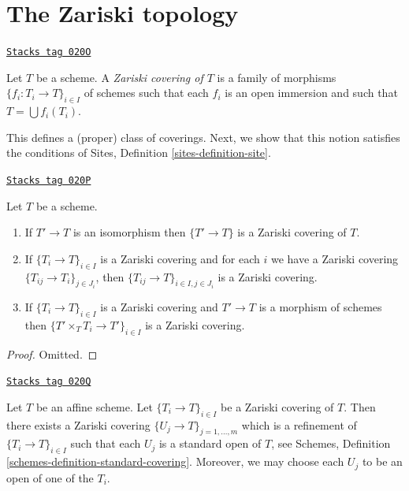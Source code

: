 \section{The Zariski topology}
\label{topologies-section-zariski}
\begin{definition}
\label{topologies-definition-zariski-covering}
\href{https://stacks.math.columbia.edu/tag/020O}{\texttt{Stacks tag 020O}}

Let $T$ be a scheme. A {\it Zariski covering of $T$} is a family
of morphisms $\{f_i : T_i \to T\}_{i \in I}$ of schemes
such that each $f_i$ is an open immersion and such
that $T = \bigcup f_i(T_i)$.
\end{definition}

This defines a (proper) class of coverings.
Next, we show that this notion satisfies the conditions of
Sites, Definition \ref{sites-definition-site}.

\begin{lemma}[Zariski]
\label{topologies-lemma-zariski}
\href{https://stacks.math.columbia.edu/tag/020P}{\texttt{Stacks tag 020P}}

Let $T$ be a scheme.
\begin{enumerate}
\item If $T' \to T$ is an isomorphism then $\{T' \to T\}$
is a Zariski covering of $T$.
\item If $\{T_i \to T\}_{i\in I}$ is a Zariski covering and for each
$i$ we have a Zariski covering $\{T_{ij} \to T_i\}_{j\in J_i}$, then
$\{T_{ij} \to T\}_{i \in I, j\in J_i}$ is a Zariski covering.
\item If $\{T_i \to T\}_{i\in I}$ is a Zariski covering
and $T' \to T$ is a morphism of schemes then
$\{T' \times_T T_i \to T'\}_{i\in I}$ is a Zariski covering.
\end{enumerate}
\end{lemma}

\begin{proof}
Omitted.
\end{proof}

\begin{lemma}
\label{topologies-lemma-zariski-affine}
\href{https://stacks.math.columbia.edu/tag/020Q}{\texttt{Stacks tag 020Q}}

Let $T$ be an affine scheme. Let $\{T_i \to T\}_{i \in I}$ be a
Zariski covering of $T$. Then there exists a Zariski covering
$\{U_j \to T\}_{j = 1, \ldots, m}$ which is a refinement
of $\{T_i \to T\}_{i \in I}$ such that each $U_j$ is a standard
open of $T$, see
Schemes, Definition \ref{schemes-definition-standard-covering}.
Moreover, we may choose each $U_j$ to be an open of one of the $T_i$.
\end{lemma}


